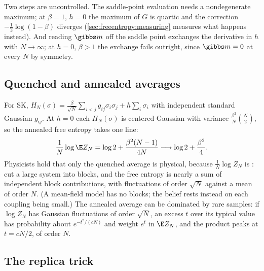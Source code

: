 \begin{refsection}
Two steps are uncontrolled. The saddle-point evaluation needs a nondegenerate maximum; at $\beta=1$, $h=0$ the maximum of $G$ is quartic and the correction $-\frac12\log(1-\beta)$ diverges (\cref{sec:freeentropy:measuring} measures what happens instead). And reading $\gibbs m$ off the saddle point exchanges the derivative in $h$ with $N\to\infty$; at $h=0$, $\beta>1$ the exchange fails outright, since $\gibbs m=0$ at every $N$ by symmetry.

\subsection{Quenched and annealed averages}\label{sec:freeentropy:quenched}

For SK, $H_N(\sigma)=\frac\beta{\sqrt N}\sum_{i<j}g_{ij}\sigma_i\sigma_j+h\sum_i\sigma_i$ with independent standard Gaussian $g_{ij}$. At $h=0$ each $H_N(\sigma)$ is centered Gaussian with variance $\frac{\beta^2}N\binom N2$, so the annealed free entropy takes one line:
\begin{equation}\label{eq:freeentropy:annealed}
\frac1N\log\E Z_N=\log2+\frac{\beta^2(N-1)}{4N}\longrightarrow\log2+\frac{\beta^2}4 .
\end{equation}
Physicists hold that only the quenched average is physical, because $\frac1N\log Z_N$ is : cut a large system into blocks, and the free entropy is nearly a sum of independent block contributions, with fluctuations of order $\sqrt N$ against a mean of order $N$. (A mean-field model has no blocks; the belief rests instead on each coupling being small.) The annealed average can be dominated by rare samples: if $\log Z_N$ has Gaussian fluctuations of order $\sqrt N$, an excess $t$ over its typical value has probability about $e^{-t^2/(cN)}$ and weight $e^t$ in $\E Z_N$, and the product peaks at $t=cN/2$, of order $N$.

\subsection{The replica trick}\label{sec:freeentropy:replicas}


\end{refsection}
